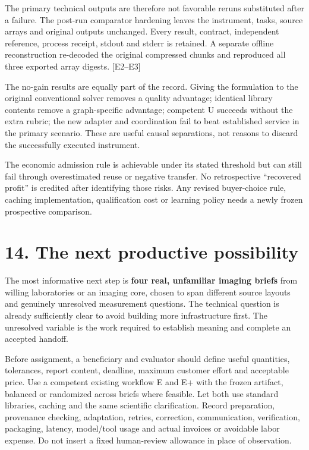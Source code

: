 \documentclass[10pt,a4paper]{article}
\begin{document}
The primary technical outputs are therefore not favorable reruns
substituted after a failure. The post-run comparator hardening leaves
the instrument, tasks, source arrays and original outputs unchanged.
Every result, contract, independent reference, process receipt, stdout
and stderr is retained. A separate offline reconstruction re-decoded the
original compressed chunks and reproduced all three exported array
digests. {[}E2--E3{]}

The no-gain results are equally part of the record. Giving the
formulation to the original conventional solver removes a quality
advantage; identical library contents remove a graph-specific advantage;
competent U succeeds without the extra rubric; the new adapter and
coordination fail to beat established service in the primary scenario.
These are useful causal separations, not reasons to discard the
successfully executed instrument.

The economic admission rule is achievable under its stated threshold but
can still fail through overestimated reuse or negative transfer. No
retrospective ``recovered profit'' is credited after identifying those
risks. Any revised buyer-choice rule, caching implementation,
qualification cost or learning policy needs a newly frozen prospective
comparison.

\clearpage

\hypertarget{the-next-productive-possibility}{%
\section{14. The next productive
possibility}\label{the-next-productive-possibility}}

The most informative next step is \textbf{four real, unfamiliar imaging
briefs} from willing laboratories or an imaging core, chosen to span
different source layouts and genuinely unresolved measurement questions.
The technical question is already sufficiently clear to avoid building
more infrastructure first. The unresolved variable is the work required
to establish meaning and complete an accepted handoff.

Before assignment, a beneficiary and evaluator should define useful
quantities, tolerances, report content, deadline, maximum customer
effort and acceptable price. Use a competent existing workflow E and E+
with the frozen artifact, balanced or randomized across briefs where
feasible. Let both use standard libraries, caching and the same
scientific clarification. Record preparation, provenance checking,
adaptation, retries, correction, communication, verification, packaging,
latency, model/tool usage and actual invoices or avoidable labor
expense. Do not insert a fixed human-review allowance in place of
observation.
\end{document}
